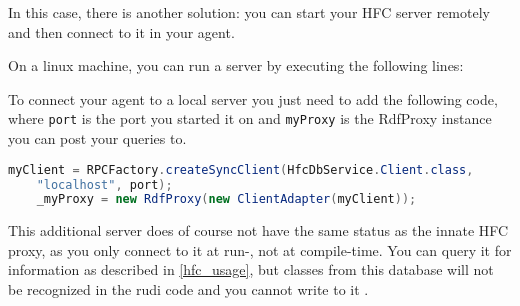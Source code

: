 In this case, there is another solution: you can start your HFC server remotely and then connect to it in your \vonda agent.

On a linux machine, you can run a server by executing the following lines:

To connect your \vonda agent to a local server you just need to add the following code, where \texttt{port} is the port you started it on and \texttt{myProxy} is the RdfProxy instance you can post your queries to.

\begin{center}
	\begin{lstlisting}[language=Java]
	myClient = RPCFactory.createSyncClient(HfcDbService.Client.class,
	"localhost", port);
	_myProxy = new RdfProxy(new ClientAdapter(myClient));
	\end{lstlisting}
\end{center}

This additional server does of course not have the same status as the innate HFC proxy, as you only connect to it at run-, not at compile-time. You can query it for information as described in \ref{hfc_usage}, but classes from this database will not be recognized in the rudi code and you cannot write to it . 
